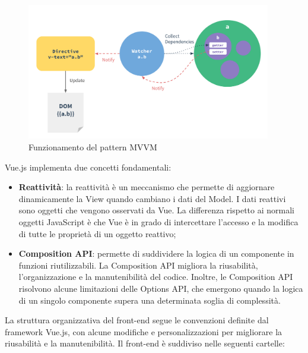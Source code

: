 \begin{figure}[H]
  \centering
  \includegraphics[width=0.95\textwidth]{assets/Frontend/overview_mvvm.png}
  \caption{Funzionamento del pattern MVVM}
\end{figure}

\par Vue.js implementa due concetti fondamentali:
\begin{itemize}
  \item \textbf{Reattività}: la reattività è un meccanismo che permette di aggiornare dinamicamente la View quando cambiano i dati del Model. I dati reattivi sono oggetti che vengono osservati da Vue. La differenza rispetto ai normali oggetti JavaScript è che Vue è in grado di intercettare l'accesso e la modifica di tutte le proprietà di un oggetto reattivo;
  \item \textbf{Composition API}: permette di suddividere la logica di un componente in funzioni riutilizzabili. La Composition API migliora la riusabilità, l'organizzazione e la manutenibilità del codice. Inoltre, le Composition API risolvono alcune limitazioni delle Options API, che emergono quando la logica di un singolo componente supera una determinata soglia di complessità.
\end{itemize}

\vspace{0.5\baselineskip}
\par La struttura organizzativa del front-end segue le convenzioni definite dal framework Vue.js, con alcune modifiche e personalizzazioni per migliorare la riusabilità e la manutenibilità. Il front-end è suddiviso nelle seguenti cartelle:

\begin{minipage}{\textwidth}
\end{minipage}
